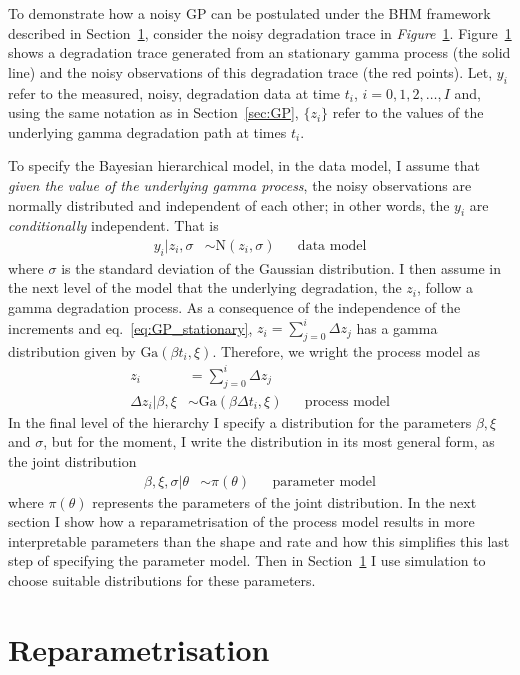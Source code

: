 To demonstrate how a noisy GP can be postulated under the BHM framework described in Section~\ref{}, consider the noisy degradation trace in \textit{Figure}~\ref{}. Figure~\ref{} shows a degradation trace generated from an stationary gamma process (the solid line) and the noisy observations of this degradation trace (the red points). Let, $y_i$ refer to the measured, noisy, degradation data at time $t_i$, $i = 0, 1, 2, \ldots, I$ and, using the same notation as in Section~\ref{sec:GP}, $\{ z_i \}$ refer to the values of the underlying gamma degradation path at times $t_i$.

To specify the Bayesian hierarchical model, in the data model, I assume that \emph{given the value of the underlying gamma process}, the noisy observations are normally distributed and independent of each other; in other words, the $y_i$ are \emph{conditionally} independent. That is
\begin{align*}
  y_i|z_i, \sigma & \sim \mbox{N}(z_i, \sigma)  && \mbox{data model}
\end{align*}
where $\sigma$ is the standard deviation of the Gaussian distribution. I then assume in the next level of the model that the underlying degradation, the $z_i$, follow a gamma degradation process. As a consequence of the independence of the increments and eq.~\ref{eq:GP_stationary}, $z_i = \sum_{j = 0}^i \Delta z_j$ has a gamma distribution given by $\mbox{Ga}(\beta t_i, \xi)$. Therefore, we wright the process model as
\begin{align*}
  z_i & = \sum_{j=0}^i \Delta z_j \\ 
  \Delta z_i | \beta, \xi & \sim \mbox{Ga}(\beta \Delta t_i, \xi) && \mbox{process model}
\end{align*}
In the final level of the hierarchy I specify a distribution for the parameters $\beta, \xi$ and $\sigma$, but for the moment, I write the distribution in its most general form, as the joint distribution
\begin{align*}
    \beta, \xi, \sigma | \theta & \sim \pi(\theta) && \mbox{parameter model}
\end{align*}
where $\pi(\theta)$ represents the parameters of the joint distribution. In the next section I show how a reparametrisation of the process model results in more interpretable parameters than the shape and rate and how this simplifies this last step of specifying the parameter model. Then in Section~\ref{} I use simulation to choose suitable distributions for these parameters.

\section{Reparametrisation}

